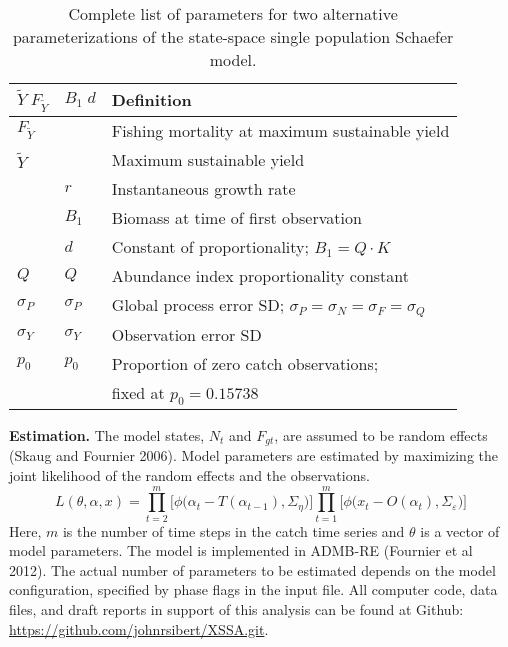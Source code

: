 \documentclass[12pt,letterpaper,twoside]{article}
\newcommand\MSY{\tilde{Y}}
\newcommand\Fmsy{F_{\MSY}}
\begin{document}
\begin{table}
\caption{Complete list of parameters for two alternative
parameterizations of the state-space single population Schaefer model.
\label{tab:allvars1}}
\begin{center}
\begin{tabular}{lll}
\hline
$\MSY\;\Fmsy$ & $B_1\;d$ & Definition\\
\hline
\hline
$\Fmsy$&  & Fishing mortality at maximum sustainable yield\\
$\MSY$ &  & Maximum sustainable yield\\
    & $r$ & Instantaneous growth rate\\
    & $B_1$ & Biomass at time of first observation\\
    &  $d $ & Constant of proportionality; $B_1=Q\cdot K$\\
$Q$ & $Q$ & Abundance index proportionality constant\\
$\sigma_P$ & $\sigma_P$ & Global process error SD; $\sigma_P=\sigma_N=\sigma_F=\sigma_Q$\\
$\sigma_Y$ & $\sigma_Y$ & Observation error SD \\
\hline
$p_0$ & $p_0$ & Proportion of zero catch observations;\\
      &        & fixed at $p_0 = 0.15738$\\
\hline
\end{tabular}
\end{center}
\end{table}

{\bf Estimation.} The model states, $N_t$ and $F_{gt}$, are assumed to be random
effects (Skaug and Fournier 2006). Model parameters are estimated by
maximizing the joint likelihood of the random
effects and the observations.
\begin{equation}
L(\theta,\alpha,x)=
\prod^m_{t=2}\big[\phi\big(\alpha_t-T(\alpha_{t-1}), \Sigma_\eta\big)\big]
\prod^m_{t=1}\big[\phi\big(x_t-O(\alpha_t), \Sigma_\varepsilon\big)\big]
\end{equation}
Here, $m$ is the number of time steps in the catch time series and
$\theta$ is a vector of model parameters.
The model is implemented in ADMB-RE (Fournier et al 2012).
The actual number of
parameters to be estimated depends on the model configuration,
specified by phase flags in the input file. 
All computer code, data files, and draft reports in support of this
analysis can be found at Github:
\url{https://github.com/johnrsibert/XSSA.git}.



\clearpage

\end{document}
